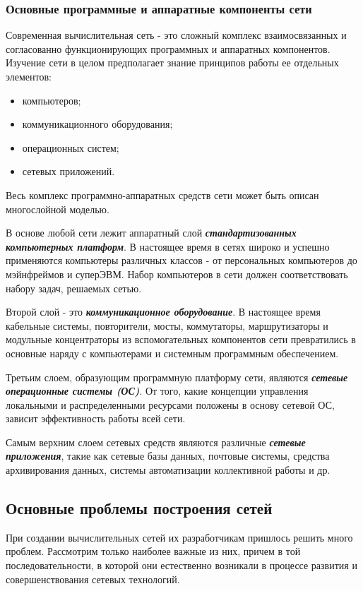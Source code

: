 \subsubsection{Основные программные и аппаратные компоненты сети}

Современная вычислительная сеть - это сложный комплекс взаимосвязанных и согласованно функционирующих программных и аппаратных компонентов.
Изучение сети в целом предполагает знание принципов работы ее отдельных элементов:
\begin{itemize}
    \item компьютеров;
    \item коммуникационного оборудования;
    \item операционных систем;
    \item сетевых приложений.
\end{itemize}

Весь комплекс программно-аппаратных средств сети может быть описан многослойной моделью.

В основе любой сети лежит аппаратный слой \textbf{\textit{стандартизованных компьютерных платформ}}.
В настоящее время в сетях широко и успешно применяются компьютеры различных классов - от персональных компьютеров до мэйнфреймов и суперЭВМ.
Набор компьютеров в сети должен соответствовать набору задач, решаемых сетью.

Второй слой - это \textbf{\textit{коммуникационное оборудование}}. В настоящее время кабельные системы, повторители, мосты, коммутаторы, маршрутизаторы и модульные концентраторы из вспомогательных компонентов сети превратились в основные наряду с компьютерами и системным программным обеспечением.

Третьим слоем, образующим программную платформу сети, являются \textbf{\textit{сетевые операционные системы (ОС)}}. От того, какие концепции управления локальными и распределенными ресурсами положены в основу сетевой ОС, зависит эффективность работы всей сети.

Самым верхним слоем сетевых средств являются различные \textbf{\textit{сетевые приложения}}, такие как сетевые базы данных, почтовые системы, средства архивирования данных, системы автоматизации коллективной работы и др.

\subsection{Основные проблемы построения сетей}
При создании вычислительных сетей их разработчикам пришлось решить много проблем.
Рассмотрим только наиболее важные из них, причем в той последовательности, в которой они естественно возникали в процессе развития и совершенствования сетевых технологий.


